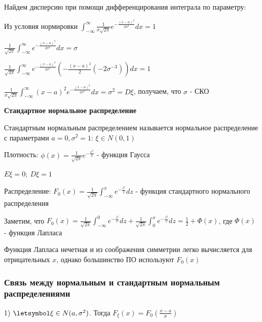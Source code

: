 \documentclass[12pt]{article}
\begin{document}
    Найдем дисперсию при помощи дифференцирования интеграла по параметру: 
    
    Из условия нормировки $\int_{-\infty}^\infty \frac{1}{\sigma \sqrt{2\pi}} e^{-\frac{(x - a)^2}{2\sigma^2}} dx = 1$

    $\frac{1}{\sqrt{2\pi}} \int_{-\infty}^\infty e^{-\frac{(x - a)^2}{2\sigma^2}} dx = \sigma$
    
    $\frac{1}{\sqrt{2\pi}} \int_{-\infty}^\infty e^{-\frac{(x - a)^2}{2\sigma^2}} \left(-\frac{(x - a)^2}{2} (-2\sigma^{-3})\right) dx = 1$
    
    $\frac{1}{\sigma\sqrt{2\pi}} \int_{-\infty}^\infty (x - a)^2 e^{-\frac{(x - a)^2}{2\sigma^2}} dx = \sigma^2 = D\xi$, получаем, что $\sigma$ - СКО

    \mediumvspace

    \hypertarget{standardnormaldistribution}{}

    \textbf{Стандартное нормальное распределение}

    \Def Стандартным нормальным распределением называется нормальное распределение с параметрами $a = 0, \sigma^2 = 1$: $\xi \in N(0, 1)$

    Плотность: $\phi(x) = \frac{1}{\sqrt{2\pi}} e^{-\frac{x^2}{2}}$ - функция Гаусса

    $E\xi = 0; \ D\xi = 1$

    Распределение: $F_0(x) = \frac{1}{\sqrt{2\pi}} \int_{-\infty}^x e^{-\frac{z^2}{2}} dz$ - функция стандартного нормального распределения

    Заметим, что $F_0(x) = \frac{1}{\sqrt{2\pi}} \int_{-\infty}^0 e^{-\frac{z^2}{2}} dz + \frac{1}{\sqrt{2\pi}} \int_0^x e^{-\frac{z^2}{2}} dz = \frac{1}{2} + \Phi(x)$, где $\Phi(x)$ - функция Лапласа

    Функция Лапласа нечетная и из соображения симметрии легко вычисляется для отрицательных $x$, однако большинство ПО используют $F_0(x)$
    
    \hypertarget{connectionbetweennormalandstandard}{}

    \subsubsection{Связь между нормальным и стандартным нормальным распределениями}

    1) $\letsymbol \xi \in N(a, \sigma^2)$. Тогда $F_\xi(x) = F_0\left(\frac{x - a}{\sigma}\right)$
\end{document}
